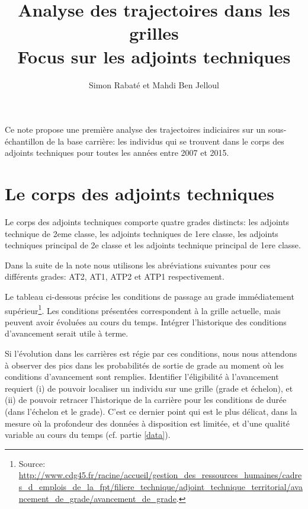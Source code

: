 \documentclass[11pt,a4paper]{article}
\begin{document}
\title{Analyse des trajectoires dans les grilles \\ Focus sur les adjoints techniques}


\author{Simon Rabat\'e et Mahdi Ben Jelloul}


\maketitle

Ce note propose une première analyse des trajectoires indiciaires sur un sous-échantillon de la base carrière: les individus qui se trouvent dans le corps des adjoints techniques pour toutes les années entre 2007 et 2015. 

\renewcommand*\contentsname{\textsc{Plan de la note}}
\tableofcontents

\clearpage


\section{Le corps des adjoints techniques}

Le corps des adjoints techniques comporte quatre grades distincts: les adjoints technique de 2eme classe, les adjoints techniques de 1ere classe, les adjoints techniques principal de 2e classe et les adjoints technique principal de 1ere classe. 

Dans la suite de la note nous utilisons les abréviations suivantes pour ces différents grades: AT2, AT1, ATP2 et ATP1 respectivement. 

Le tableau ci-dessous précise les conditions de passage au grade immédiatement supérieur\footnote{Source: \url{http://www.cdg45.fr/racine/accueil/gestion_des_ressources_humaines/cadres_d_emplois_de_la_fpt/filiere_technique/adjoint_technique_territorial/avancement_de_grade/avancement_de_grade}.}. Les conditions présentées correspondent à la grille actuelle, mais peuvent avoir évoluées au cours du temps. Intégrer l'historique des conditions d'avancement serait utile à terme. 

Si l'évolution dans les carrières est régie par ces conditions, nous nous attendons à observer des pics dans les probabilités de sortie de grade au moment où les conditions d'avancement sont remplies. Identifier l'éligibilité à l'avancement requiert (i) de pouvoir localiser un individu sur une grille (grade et échelon), et (ii) de pouvoir retracer l'historique de la carrière pour les conditions de durée (dans l'échelon et le grade). C'est ce dernier point qui est le plus délicat, dans la mesure où la profondeur des données à disposition est limitée, et d'une qualité variable au cours du temps (cf. partie \ref{data}). 
\end{document}
